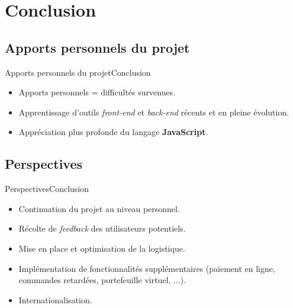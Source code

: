 \documentclass[usenames,dvipsnames]{beamer}
\begin{document}
\section{Conclusion}
\subsection{Apports personnels du projet}
\begin{frame}{Apports personnels du projet}{Conclusion}
  \begin{itemize}
    \item Apports personnels = difficultés survenues.
    \item Apprentissage d'outils \textit{front-end} et \textit{back-end} récents et en pleine évolution.
    \item Appréciation plus profonde du langage \textbf{JavaScript}.
  \end{itemize}
\end{frame}
\subsection{Perspectives}
\begin{frame}{Perspectives}{Conclusion}
  \begin{itemize}
    \item Continuation du projet au niveau personnel.
    \item Récolte de \textit{feedback} des utilisateurs potentiels.
    \item Mise en place et optimisation de la logistique.
    \item Implémentation de fonctionnalités supplémentaires (paiement en ligne, commandes retardées, portefeuille virtuel, $\dots$).
    \item Internationalisation.
 \end{itemize}
\end{frame}
\end{document}
